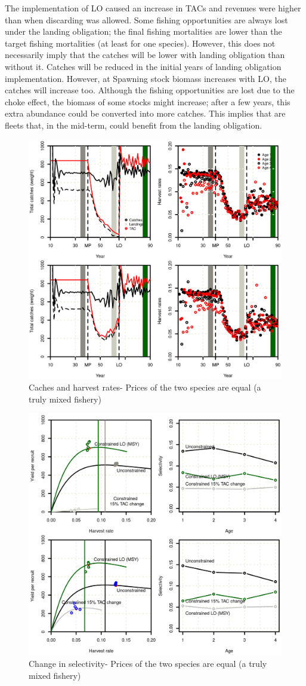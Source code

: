 \documentclass[12pt,oneline,a4paper,numbib]{ouparticle}
\numberwithin{equation}{subsection} %
\begin{document}
The implementation of LO caused an increase in TACs and revenues were higher than when discarding was allowed. Some fishing opportunities are always lost under the landing obligation; the final fishing mortalities are lower than the target fishing mortalities (at least for one species). However, this does not necessarily imply that the catches will be lower with landing obligation than without it. Catches will be reduced in the initial years of landing obligation implementation. However, at Spawning stock biomass increases with LO, the catches will increase too. Although the fishing opportunities are lost due to the choke effect, the biomass of some stocks might increase; after a few years, this extra abundance could be converted into more catches. This implies that are fleets that, in the mid-term, could benefit from the landing obligation.

\begin{figure}[!ht]
\centering
\includegraphics[width=.69\textwidth]{Figures/figurecatches.eps} 
\caption{Caches and harvest rates- Prices of the two species are equal (a truly mixed fishery)}
\end{figure}

\begin{figure}[!ht]
\centering
\includegraphics[width=.69\textwidth]{Figures/figurecatches2.eps} 
\caption{Change in selectivity- Prices of the two species are equal (a truly mixed fishery)}
\end{figure}
\end{document}

